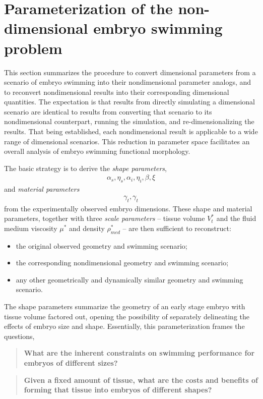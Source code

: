 \documentclass[10pt,a4paper]{article}
\def\Vts{V_t^*}
\begin{document}
\section{Parameterization of the non-dimensional embryo swimming problem}\label{NDparsSect}
This section summarizes the procedure to convert dimensional parameters from a scenario of embryo swimming into their nondimensional parameter analogs, and to reconvert nondimensional results into their corresponding dimensional quantities.
The expectation is that results from directly simulating a dimensional scenario are identical to results from converting that scenario to its nondimensional counterpart, running the simulation, and re-dimensionalizing the results.
That being established, each nondimensional result is applicable to a wide range of dimensional scenarios. This reduction in parameter space facilitates an overall analysis of embryo swimming functional morphology.

The basic strategy is to derive the \textit{shape parameters}, 
\begin{eqnarray}\label{shapars}
	\alpha_s, \eta_s, \alpha_{i}, \eta_{i}, \beta, \xi
\end{eqnarray}
and \textit{material parameters}
\begin{eqnarray}\label{matpars}
	\gamma_t, \gamma_t
\end{eqnarray}
from the experimentally observed embryo dimensions.
These shape and material parameters, together with three \textit{scale parameters} -- tissue volume $\Vts$ and the fluid medium viscosity $\mu^*$ and density $\rho_{med}^*$ -- are then sufficient to reconstruct:
\begin{itemize}
	\item the original observed geometry and swimming scenario;
	\item the corresponding nondimensional geometry and swimming scenario;
	\item any other geometrically and dynamically similar geometry and swimming scenario.
\end{itemize}
The shape parameters summarize the geometry of an early stage embryo with tissue volume factored out, opening the possibility of separately delineating the effects of embryo size and shape.
Essentially, this parameterization frames the questions,
\begin{quotation}
	\textbf{What are the inherent constraints on swimming performance for embryos of different sizes?}
\end{quotation}
\begin{quotation}
	\textbf{Given a fixed amount of tissue, what are the costs and benefits of forming that tissue into embryos of different shapes?}
\end{quotation}
\end{document}
